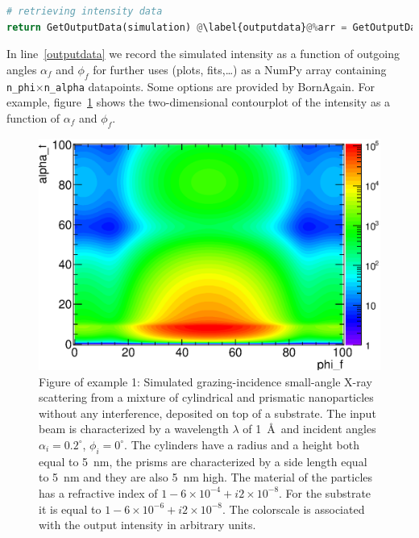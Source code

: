 \begin{lstlisting}[language=python, style=eclipseboxed,name=ex1,nolol]
# retrieving intensity data
return GetOutputData(simulation) @\label{outputdata}@%arr = GetOutputData(simulation) @\label{outputdata}@
\end{lstlisting}


\noindent In line~\ref{outputdata} we record the simulated intensity
as a function of outgoing angles $\alpha_f$ and $\phi_f$ for further
uses (plots, fits,\ldots) as a NumPy array containing
\texttt{n\_phi}$\times$\texttt{n\_alpha}
datapoints. Some options are provided by BornAgain. For example, figure~\ref{fig:output_ex1} shows the two-dimensional
contourplot of the intensity as a function of $\alpha_f$ and
$\phi_f$. 

\begin{figure}[h]
  \begin{center}
   \includegraphics[clip=true, width=120mm]{Manual_ex1.eps}
  \end{center}
  \caption[Example 1: Simulated grazing-incidence small-angle X-ray scattering from a mixture of
cylindrical and prismatic nanoparticles without any interference, deposited on top
of a substrate]{Figure of example 1: Simulated grazing-incidence small-angle X-ray scattering from a mixture of
cylindrical and prismatic nanoparticles without any interference, deposited on top
of a substrate. The input beam is characterized by a wavelength
$\lambda$ of 1~\AA\ and incident angles $\alpha_i=0.2^{\circ}$, $\phi_i=0^{\circ}$. The
cylinders have a radius and a height both equal to 5~nm, the prisms
are characterized by a side length equal to 5~nm and they are also 5~nm high. The
material of the particles has a refractive index of $1-6\times 10^{-4}+i2\times 10^{-8}$. For the substrate
it is equal to $1-6\times 10^{-6} +i2\times 10^{-8} $. The colorscale
is associated with the output intensity in arbitrary units. }
\label{fig:output_ex1}
\end{figure}

